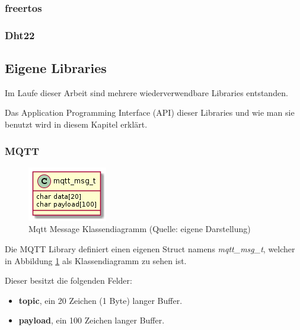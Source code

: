 \subsubsection{freertos}\label{sec:esp-idf-libraries-freertos}
\subsubsection{Dht22}\label{sec:esp-idf-libraries-dht22}




\subsection{Eigene Libraries}\label{sec:own-libraries}


Im Laufe dieser Arbeit sind mehrere wiederverwendbare Libraries entstanden.

Das Application Programming Interface (API) dieser Libraries und wie man sie benutzt wird in diesem Kapitel erklärt.

\subsubsection{MQTT}\label{sec:own-libraries-mqtt}

\begin{figure}[H]
    \begin{center}
        \includegraphics[scale=1]{diagrams/mqtt_msg_t.png}
        \caption{Mqtt Message Klassendiagramm (Quelle: eigene Darstellung)}
        \label{abb:mqtt_msg_t_diagram}
    \end{center}    
\end{figure}

Die MQTT Library definiert einen eigenen Struct namens \textit{mqtt\_msg\_t}, welcher in Abbildung \ref{abb:mqtt_msg_t_diagram} als Klassendiagramm zu sehen ist.

Dieser besitzt die folgenden Felder:

\begin{itemize}
    \item \textbf{topic}, ein 20 Zeichen (1 Byte) langer Buffer.
    \item \textbf{payload}, ein 100 Zeichen langer Buffer.
\end{itemize}

